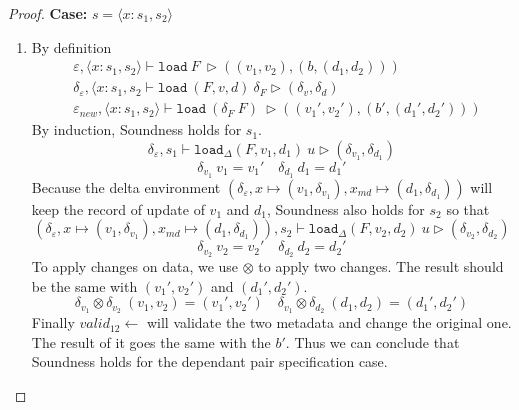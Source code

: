 \documentclass[10pt,twoside,a4paper]{article}
\theoremstyle{theorem}
\theoremstyle{lemma}
\theoremstyle{property}
\theoremstyle{definition}
\theoremstyle{assumption}
\begin{document}
\begin{proof}
	\textbf{Case: } $s = \langle x : s_1, s_2 \rangle$\\
	\begin{enumerate}	
	\item
	By definition
	\begin{align*}
			& \varepsilon, \langle x : s_1, s_2 \rangle \vdash \mathtt{load}~ F~ \rhd ((v_1, v_2), (b, (d_1, d_2)))\\
			& \delta_\varepsilon, \langle x : s_1, s_2 \vdash \mathtt{load}~ (F,v,d)~ \delta_F \rhd (\delta_v, \delta_d)\\
			& \varepsilon_{new}, \langle x : s_1, s_2 \rangle \vdash \mathtt{load}~ (\delta_F~F)~ \rhd ((v_1', v_2'), (b', (d_1', d_2')))
	\end{align*}
	By induction, Soundness holds for $s_1$.
	\begin{displaymath}
		\delta_\varepsilon, s_1 \vdash \mathtt{load}_\Delta (F,v_1,d_1)~ u \rhd (\delta_{v_1},\delta_{d_1})
	\end{displaymath}
	\begin{displaymath}
		\delta_{v_1} ~v_1 = v_1' \quad \delta_{d_1} ~d_1 = d_1'
	\end{displaymath}
	Because the delta environment $(\delta_\varepsilon, x \mapsto (v_1,\delta_{v_1}), x_{md} \mapsto (d_1,\delta_{d_1}))$ will keep the record of update of $v_1$ and $d_1$, Soundness also holds for $s_2$ so that
	\begin{displaymath}
		(\delta_\varepsilon, x \mapsto (v_1,\delta_{v_1}), x_{md} \mapsto (d_1,\delta_{d_1})), s_2 \vdash \mathtt{load}_\Delta (F,v_2,d_2)~ u \rhd (\delta_{v_2},\delta_{d_2})
	\end{displaymath}
	\begin{displaymath}
		\delta_{v_2} ~v_2 = v_2' \quad \delta_{d_2} ~d_2 = d_2'
	\end{displaymath}
	To apply changes on data, we use $\otimes$ to apply two changes. The result should be the same with $(v_1', v_2')$ and $(d_1', d_2')$.
	\begin{displaymath}
		\delta_{v_1} \otimes \delta_{v_2} ~(v_1, v_2) = (v_1', v_2') \quad \delta_{v_1} \otimes \delta_{d_2} ~(d_1, d_2) = (d_1', d_2')
	\end{displaymath}
	Finally $valid_{12} \leftarrow$ will validate the two metadata and change the original one. The result of it goes the same with the $b'$. Thus we can conclude that Soundness holds for the dependant pair specification case.
	\end{enumerate}


\end{proof}
\end{document}
